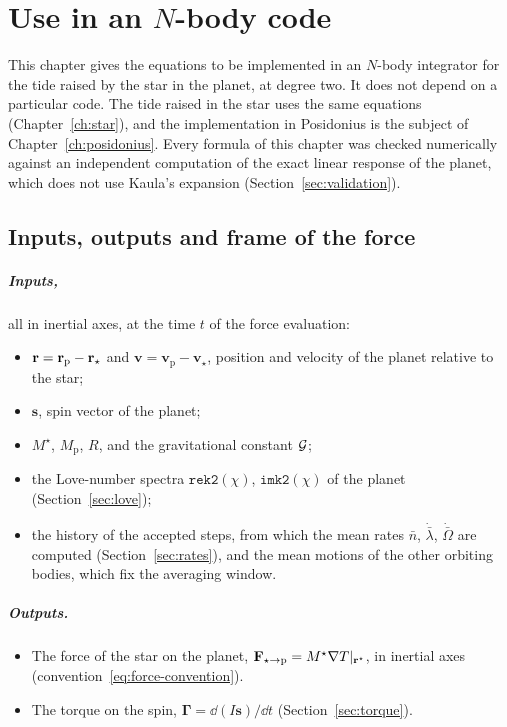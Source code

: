\chapter{Use in an $N$-body code}\label{ch:nbody}

This chapter gives the equations to be implemented in an $N$-body integrator for the tide raised by the star in the planet, at degree two. It does not depend on a particular code. The tide raised in the star uses the same equations (Chapter~\ref{ch:star}), and the implementation in Posidonius is the subject of Chapter~\ref{ch:posidonius}. Every formula of this chapter was checked numerically against an independent computation of the exact linear response of the planet, which does not use Kaula's expansion (Section~\ref{sec:validation}).

\section{Inputs, outputs and frame of the force}\label{sec:io}
\paragraph{Inputs,} all in inertial axes, at the time $t$ of the force evaluation:
\begin{itemize}
  \item $\mathbf r=\mathbf r_{\mathrm p}-\mathbf r_\star$ and $\mathbf v=\mathbf v_{\mathrm p}-\mathbf v_\star$, position and velocity of the planet relative to the star;
  \item $\mathbf s$, spin vector of the planet;
  \item $M^\star$, $M_{\mathrm p}$, $R$, and the gravitational constant $\mathcal{G}$;
  \item the Love-number spectra $\texttt{rek2}(\chi)$, $\texttt{imk2}(\chi)$ of the planet (Section~\ref{sec:love});
  \item the history of the accepted steps, from which the mean rates $\bar n$, $\dot{\bar\lambda}$, $\dot{\bar\Omega}$ are computed (Section~\ref{sec:rates}), and the mean motions of the other orbiting bodies, which fix the averaging window.
\end{itemize}

\paragraph{Outputs.}
\begin{itemize}
  \item The force of the star on the planet, $\mathbf F_{\star\to\mathrm p}=M^\star\nabla T|_{\mathbf r^\star}$, in inertial axes (convention~\eqref{eq:force-convention}).
  \item The torque on the spin, $\boldsymbol\Gamma=\dd(I\mathbf s)/\dd t$ (Section~\ref{sec:torque}).
\end{itemize}

